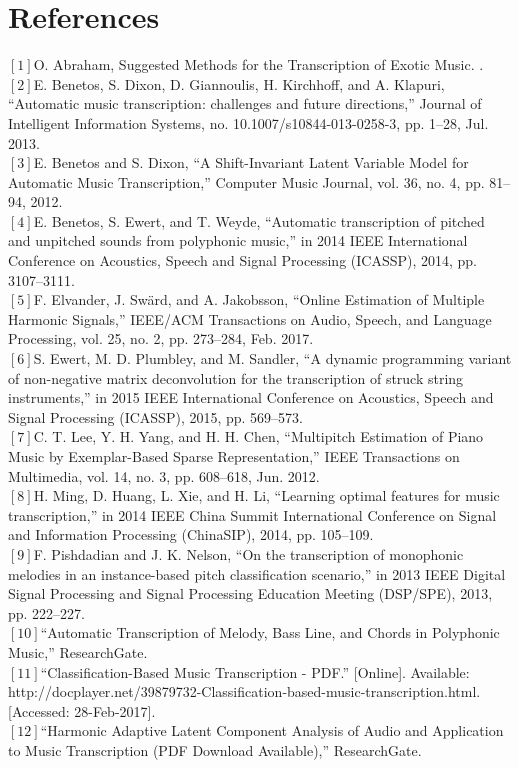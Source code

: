 \documentclass{article}
\begin{document}
\section{References}
$\left[ 1 \right] $O. Abraham, Suggested Methods for the Transcription of Exotic Music. .\\
$\left[ 2 \right] $E. Benetos, S. Dixon, D. Giannoulis, H. Kirchhoff, and A. Klapuri, “Automatic music transcription: challenges and future directions,” Journal of Intelligent Information Systems, no. 10.1007/s10844-013-0258-3, pp. 1–28, Jul. 2013.\\
$\left[ 3 \right] $E. Benetos and S. Dixon, “A Shift-Invariant Latent Variable Model for Automatic Music Transcription,” Computer Music Journal, vol. 36, no. 4, pp. 81–94, 2012.\\
$\left[ 4 \right] $E. Benetos, S. Ewert, and T. Weyde, “Automatic transcription of pitched and unpitched sounds from polyphonic music,” in 2014 IEEE International Conference on Acoustics, Speech and Signal Processing (ICASSP), 2014, pp. 3107–3111.\\
$\left[ 5 \right] $F. Elvander, J. Swärd, and A. Jakobsson, “Online Estimation of Multiple Harmonic Signals,” IEEE/ACM Transactions on Audio, Speech, and Language Processing, vol. 25, no. 2, pp. 273–284, Feb. 2017.\\
$\left[ 6 \right] $S. Ewert, M. D. Plumbley, and M. Sandler, “A dynamic programming variant of non-negative matrix deconvolution for the transcription of struck string instruments,” in 2015 IEEE International Conference on Acoustics, Speech and Signal Processing (ICASSP), 2015, pp. 569–573.\\
$\left[ 7 \right] $C. T. Lee, Y. H. Yang, and H. H. Chen, “Multipitch Estimation of Piano Music by Exemplar-Based Sparse Representation,” IEEE Transactions on Multimedia, vol. 14, no. 3, pp. 608–618, Jun. 2012.\\
$\left[ 8 \right] $H. Ming, D. Huang, L. Xie, and H. Li, “Learning optimal features for music transcription,” in 2014 IEEE China Summit International Conference on Signal and Information Processing (ChinaSIP), 2014, pp. 105–109.\\
$\left[ 9 \right] $F. Pishdadian and J. K. Nelson, “On the transcription of monophonic melodies in an instance-based pitch classification scenario,” in 2013 IEEE Digital Signal Processing and Signal Processing Education Meeting (DSP/SPE), 2013, pp. 222–227.\\
$\left[ 10 \right] $“Automatic Transcription of Melody, Bass Line, and Chords in Polyphonic Music,” ResearchGate.\\
$\left[ 11 \right] $“Classification-Based Music Transcription - PDF.” [Online]. Available: http://docplayer.net/39879732-Classification-based-music-transcription.html. [Accessed: 28-Feb-2017].\\
$\left[ 12 \right] $“Harmonic Adaptive Latent Component Analysis of Audio and Application to Music Transcription (PDF Download Available),” ResearchGate.\\
\end{document}
